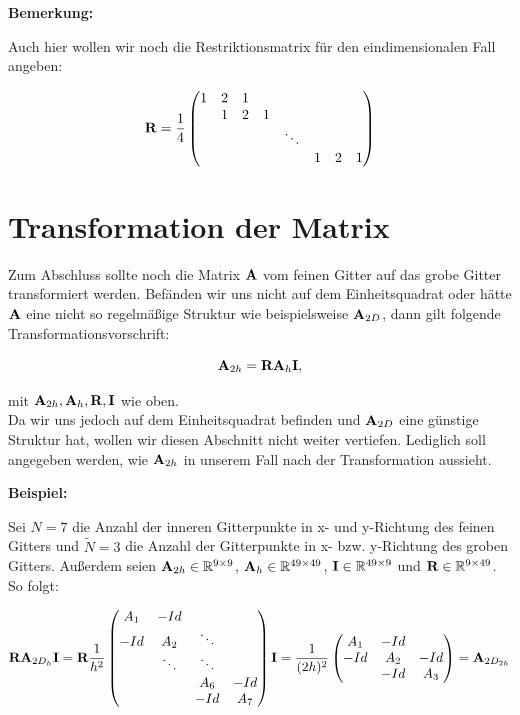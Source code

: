 \textbf{Bemerkung:}

Auch hier wollen wir noch die Restriktionsmatrix für den eindimensionalen Fall angeben:

\begin{equation}
{\textbf{R}} = \frac {1} {4}
\begin{pmatrix}
1 & 2 & 1\\
  & 1 & 2 & 1\\
  &   &   &   & \ddots\\
  &   &   &   &        & 1 & 2 & 1
\end{pmatrix}
\end{equation}

\section{Transformation der Matrix}

Zum Abschluss sollte noch die Matrix ${\textbf{A}}$ vom feinen Gitter auf das grobe Gitter transformiert werden. Befänden wir uns nicht auf dem Einheitsquadrat oder hätte ${\textbf{A}}$ eine nicht so regelmäßige Struktur wie beispielsweise ${\textbf{A}}_{2D}$, dann gilt folgende Transformationsvorschrift:

\begin{equation}
{\textbf{A}}_{2h} = {\textbf{R}}{\textbf{A}}_{h}{\textbf{I}},
\end{equation}

mit ${\textbf{A}}_{2h},{\textbf{A}}_{h},{\textbf{R}},{\textbf{I}}$ wie oben.\\
Da wir uns jedoch auf dem Einheitsquadrat befinden und ${\textbf{A}}_{2D}$ eine günstige Struktur hat, wollen wir diesen Abschnitt nicht weiter vertiefen. Lediglich soll angegeben werden, wie ${\textbf{A}}_{2h}$ in unserem Fall nach der Transformation aussieht.

\textbf{Beispiel:}

Sei $N = 7$ die Anzahl der inneren Gitterpunkte in x- und y-Richtung des feinen Gitters und $\tilde N = 3$ die Anzahl der Gitterpunkte in x- bzw. y-Richtung des groben Gitters. Außerdem seien ${\textbf{A}}_{2h} \in \mathbb{R}^{9 \times 9}$, ${\textbf{A}}_{h} \in \mathbb{R}^{49 \times 49}$, ${\textbf{I}} \in \mathbb{R}^{49 \times 9}$ und ${\textbf{R}} \in \mathbb{R}^{9 \times 49}$. So folgt:

\begin{equation}
{\textbf{R}}{\textbf{A}}_{2D_{h}}{\textbf{I}} = {\textbf{R}} \frac{1}{h^{2}}
\begin{pmatrix}
A_{1} & -Id \\
-Id & A_{2} & \ddots \\
 & \ddots & \ddots \\
 & & A_{6} & -Id\\
 & & -Id & A_{7}
\end{pmatrix}
{\textbf{I}} = \frac{1}{(2h)^{2}}
\begin{pmatrix}
A_{1} & -Id \\
-Id & A_{2} & -Id \\
 & -Id & A_{3}
\end{pmatrix}
= {\textbf{A}}_{2D_{2h}}
\end{equation}

